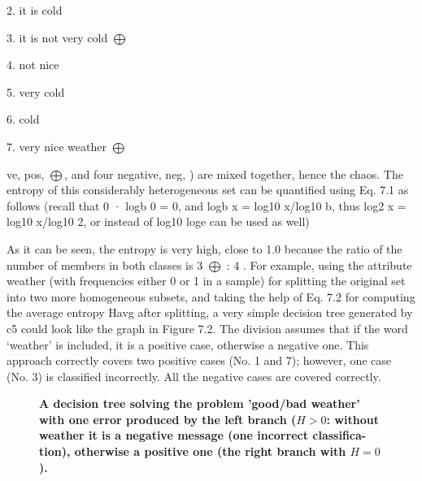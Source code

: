 \documentclass[11pt,openany,executivepaper]{book}
\begin{document}
2. it is cold 	

3. it is not very cold $\bigoplus$

4. not nice 	

5. very cold 	

6. cold 	

7. very nice weather $\bigoplus$

ve, pos, $\bigoplus$, and four negative, neg, 	 ) are mixed together, hence the chaos.
The entropy of this considerably heterogeneous set can be quantified using
Eq. 7.1 as follows (recall that 0 · logb
0 = 0, and logb
x = log10 x/log10 b, thus
log2
x = log10 x/log10 2, or instead of log10 loge
can be used as well)

As it can be seen, the entropy is very high, close to 1.0 because the ratio of the
number of members in both classes is 3 $\bigoplus$ : 4 	 . For example, using the attribute
weather (with frequencies either 0 or 1 in a sample) for splitting the original set
into two more homogeneous subsets, and taking the help of Eq. 7.2 for computing
the average entropy Havg after splitting, a very simple decision tree generated by
c5 could look like the graph in Figure 7.2. The division assumes that if the word
‘weather’ is included, it is a positive case, otherwise a negative one.
This approach correctly covers two positive cases (No. 1 and 7); however, one
case (No. 3) is classified incorrectly. All the negative cases are covered correctly.

\begin{figure}[h!]
    \centering
    \caption{\textbf{A decision tree solving the problem 'good/bad weather' with one error produced 
        by the left branch ($H > 0$: without weather it is a negative message (one incorrect classifica-
        tion), otherwise a positive one (the right branch with $H = 0$).}
        }
    \label{fig:decision_tree_entropy}
\end{figure}
\end{document}
